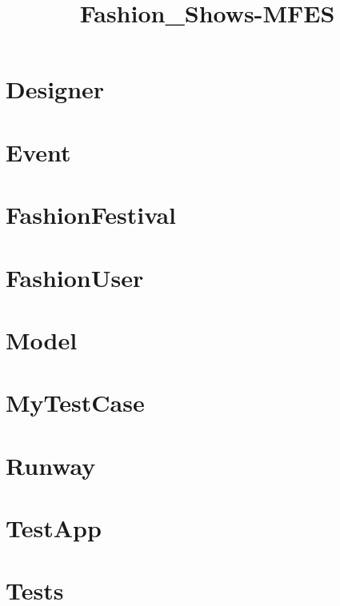 \documentclass{article}
\begin{document}
\title{Fashion\_Shows-MFES}
\author{}
\maketitle
\tableofcontents

\section{Designer}

\section{Event}

\section{FashionFestival}

\section{FashionUser}

\section{Model}

\section{MyTestCase}

\section{Runway}

\section{TestApp}

\section{Tests}

\end{document}
